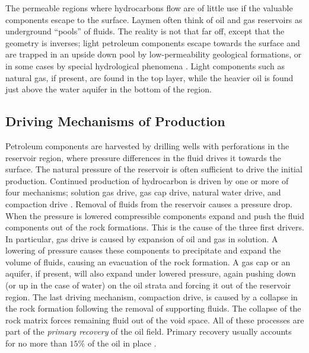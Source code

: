 The permeable regions where hydrocarbons flow are of little use if the valuable components escape to the surface. Laymen often think of oil and gas reservoirs as underground ``pools'' of fluids. The reality is not that far off, except that the geometry is inverses;  light petroleum components escape towards the surface and are trapped in an upside down pool by low-permeability geological formations, or in some cases by special hydrological phenomena \citep{jain_ch._2013}. Light components such as natural gas, if present, are found in the top layer, while the heavier oil is found just above the water aquifer in the bottom of the region.
\subsection{Driving Mechanisms of Production}
Petroleum components are harvested by drilling wells with perforations in the reservoir region, where pressure differences in the fluid drives it towards the surface. The natural pressure of the reservoir is often sufficient to drive the initial production. Continued production of hydrocarbon is driven by one or more of four mechanisms; solution gas drive, gas cap drive, natural water drive, and compaction drive \citep{dake_fundamentals_1978}. Removal of fluids from the reservoir causes a pressure drop. When the pressure is lowered compressible components expand and push the fluid components out of the rock formations. This is the cause of the three first drivers. In particular, gas drive is caused by expansion of oil and gas in solution. A lowering of pressure causes these components to precipitate and expand the volume of fluids, causing an evacuation of the rock formation. A gas cap or an aquifer, if present, will also expand under lowered pressure, again pushing down (or up in the case of water) on the oil strata and forcing it out of the reservoir region. The last driving mechanism, compaction drive, is caused by a collapse in the rock formation following the removal of supporting fluids. The collapse of the rock matrix forces remaining fluid out of the void space. All of these processes are part of the \emph{primary recovery} of the oil field. Primary recovery usually accounts for no more than $15\%$ of the oil in place \citep{tzimas_enhanced_2005}.

